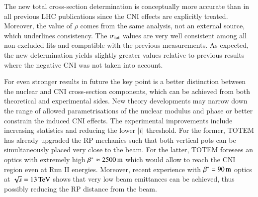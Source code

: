 The new total cross-section determination is conceptually more accurate than in all previous LHC publications since the CNI effects are explicitly treated. Moreover, the value of $\rho$ comes from the same analysis, not an external source, which underlines consistency. The $\sigma_{\rm tot}$ values are very well consistent among all non-excluded fits and compatible with the previous measurements. As expected, the new determination yields slightly greater values relative to previous results where the negative CNI was not taken into account.

For even stronger results in future the key point is a better distinction between the nuclear and CNI cross-section components, which can be achieved from both theoretical and experimental sides. New theory developments may narrow down the range of allowed parametrisations of the nuclear modulus and phase or better constrain the induced CNI effects. The experimental improvements include increasing statistics and reducing the lower $|t|$ threshold. For the former, TOTEM has already upgraded the RP mechanics such that both vertical pots can be simultaneously placed very close to the beam. For the latter, TOTEM foresees an optics with extremely high $\beta^* \approx 2500\,{\rm m}$ which would allow to reach the CNI region even at Run II energies. Moreover, recent experience with $\beta^* = 90\,{\rm m}$ optics at $\sqrt s = 13\,{\rm TeV}$ shows that very low beam emittances can be achieved, thus possibly reducing the RP distance from the beam.
